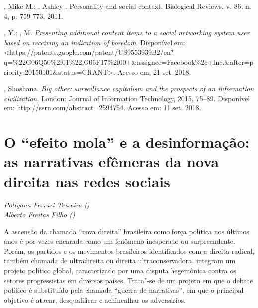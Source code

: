 \begin{Parskip}
, Mike M.; , Ashley . Personality and social context.
Biological Reviews, v. 86, n. 4, p. 759-773, 2011.

, Y.; , M. \emph{Presenting additional content items to a social
networking system user based on receiving an indication of boredom}.
Disponível em:
\textless{}https://patents.google.com/patent/US9553939B2/en?q=\%22G06Q50\%2f01\%22,G06F17\%2f00+\&assignee=Facebook\%2c+Inc.\&after=priority:20150101\&status=GRANT\textgreater{}.
Acesso em: 21 set. 2018.

, Shoshana. \emph{Big other: surveillance capitalism and the
prospects of an information civilization.} London: Journal of
Information Technology, 2015, 75--89. Disponível em:
http://ssrn.com/abstract=2594754. Acesso em: 11 set. 2018.
\end{Parskip}


\chapter*{O ``efeito mola'' e a desinformação: as narrativas efêmeras da
nova direita nas redes sociais}

\begin{flushright}
\emph{Pollyana Ferrari Teixeira ()\\Alberto Freitas Filho ()}
\end{flushright}

A ascensão da chamada ``nova direita'' brasileira como força política
nos últimos anos é por vezes encarada como um fenômeno inesperado ou
surpreendente. Porém, os partidos e os movimentos brasileiros
identificados com a direita radical, também chamada de ultradireita ou
direita ultraconservadora, integram um projeto político global,
caracterizado por uma disputa hegemônica contra os setores progressistas
em diversos países. Trata"-se de um projeto em que o debate político é
substituído pela chamada ``guerra de narrativas'', em que o principal
objetivo é atacar, desqualificar e achincalhar os adversários.

